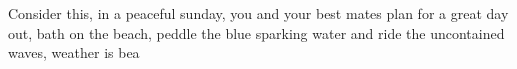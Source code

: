 Consider this, in a peaceful sunday, you and your best mates plan for a great day out, bath on the beach, peddle the blue sparking water and ride the uncontained waves, weather is bea